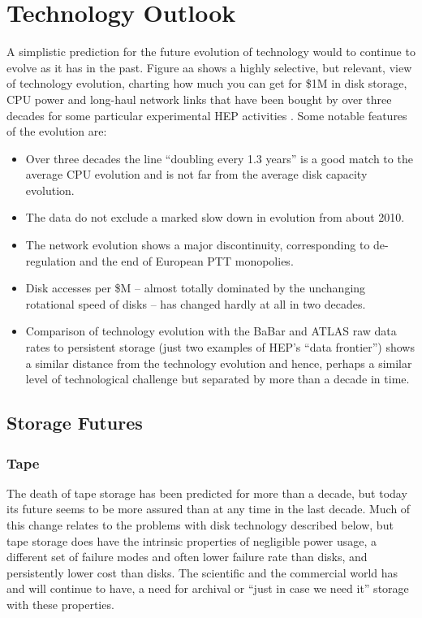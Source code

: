 \section{Technology Outlook}
\label{sec:cpfi5-technology}
A simplistic prediction for the future evolution of technology would to continue to 
evolve as it has in the past.  Figure aa shows a highly selective, but relevant, 
view of technology evolution, charting how much you can get for \$1M in disk storage, 
CPU power and long-haul network links that have been bought by over three decades 
for some particular experimental HEP activities .  Some notable features of the 
evolution are:
\begin{itemize}
\item
Over three decades the line “doubling every 1.3 years” is a good match to the average 
CPU evolution and is not far from the average disk capacity evolution.
\item
The data do not exclude a marked slow down in evolution from about 2010.
\item
The network evolution shows a major discontinuity, corresponding to de-regulation 
and the end of European PTT monopolies.
\item
Disk accesses per \$M – almost totally dominated by the unchanging rotational 
speed of disks – has changed hardly at all in two decades.
\item
Comparison of technology evolution with the BaBar and ATLAS raw data rates to 
persistent storage (just two examples of HEP’s “data frontier”) shows a similar 
distance from the technology evolution and hence, perhaps a similar level of 
technological challenge but separated by more than a decade in time. 
\end{itemize}

\subsection{Storage Futures}
\subsubsection{Tape}
The death of tape storage has been predicted for more than a decade, but today 
its future seems to be more assured than at any time in the last decade.  
Much of this change relates to the problems with disk technology described 
below, but tape storage does have the intrinsic properties of negligible 
power usage, a different set of failure modes and often lower failure rate 
than disks, and persistently lower cost than disks.  The scientific and the 
commercial world has and will continue to have, a need for archival or “just 
in case we need it” storage with these properties.


